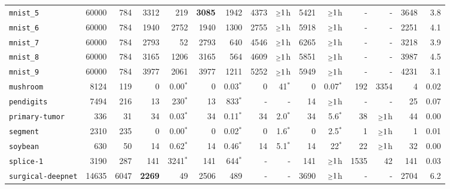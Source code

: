 \begin{tabular}{lccrrrrrrrrrrrr}
\texttt{mnist\_5} & \multicolumn{1}{r}{60000} & \multicolumn{1}{r}{784}  & 3312 & 219 & \textbf{3085} & 1942 & 4373 & $\mathsmaller{\geq}1$h & 5421 & $\mathsmaller{\geq}1$h & - & - & 3648 & 3.8\\
\texttt{mnist\_6} & \multicolumn{1}{r}{60000} & \multicolumn{1}{r}{784}  & 1940 & 2752 & 1940 & 1300 & 2755 & $\mathsmaller{\geq}1$h & 5918 & $\mathsmaller{\geq}1$h & - & - & 2251 & 4.1\\
\texttt{mnist\_7} & \multicolumn{1}{r}{60000} & \multicolumn{1}{r}{784}  & 2793 & 52 & 2793 & 640 & 4546 & $\mathsmaller{\geq}1$h & 6265 & $\mathsmaller{\geq}1$h & - & - & 3218 & 3.9\\
\texttt{mnist\_8} & \multicolumn{1}{r}{60000} & \multicolumn{1}{r}{784}  & 3165 & 1206 & 3165 & 564 & 4609 & $\mathsmaller{\geq}1$h & 5851 & $\mathsmaller{\geq}1$h & - & - & 3987 & 4.5\\
\texttt{mnist\_9} & \multicolumn{1}{r}{60000} & \multicolumn{1}{r}{784}  & 3977 & 2061 & 3977 & 1211 & 5252 & $\mathsmaller{\geq}1$h & 5949 & $\mathsmaller{\geq}1$h & - & - & 4231 & 3.1\\
\texttt{mushroom} & \multicolumn{1}{r}{8124} & \multicolumn{1}{r}{119}  & 0 & 0.00$^*$ & 0 & 0.03$^*$ & 0 & 41$^*$ & 0 & 0.07$^*$ & 192 & 3354 & 4 & 0.02\\
\texttt{pendigits} & \multicolumn{1}{r}{7494} & \multicolumn{1}{r}{216}  & 13 & 230$^*$ & 13 & 833$^*$ & - & - & 14 & $\mathsmaller{\geq}1$h & - & - & 25 & 0.07\\
\texttt{primary-tumor} & \multicolumn{1}{r}{336} & \multicolumn{1}{r}{31}  & 34 & 0.03$^*$ & 34 & 0.11$^*$ & 34 & 2.0$^*$ & 34 & 5.6$^*$ & 38 & $\mathsmaller{\geq}1$h & 44 & 0.00\\
\texttt{segment} & \multicolumn{1}{r}{2310} & \multicolumn{1}{r}{235}  & 0 & 0.00$^*$ & 0 & 0.02$^*$ & 0 & 1.6$^*$ & 0 & 2.5$^*$ & 1 & $\mathsmaller{\geq}1$h & 1 & 0.01\\
\texttt{soybean} & \multicolumn{1}{r}{630} & \multicolumn{1}{r}{50}  & 14 & 0.62$^*$ & 14 & 0.46$^*$ & 14 & 5.1$^*$ & 14 & 22$^*$ & 22 & $\mathsmaller{\geq}1$h & 32 & 0.00\\
\texttt{splice-1} & \multicolumn{1}{r}{3190} & \multicolumn{1}{r}{287}  & 141 & 3241$^*$ & 141 & 644$^*$ & - & - & 141 & $\mathsmaller{\geq}1$h & 1535 & 42 & 141 & 0.03\\
\texttt{surgical-deepnet} & \multicolumn{1}{r}{14635} & \multicolumn{1}{r}{6047}  & \textbf{2269} & 49 & 2506 & 489 & - & - & 3690 & $\mathsmaller{\geq}1$h & - & - & 2704 & 6.2\\

\end{tabular}
